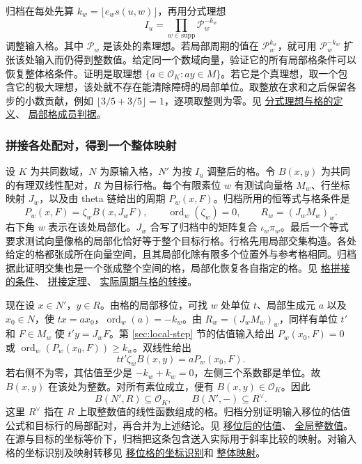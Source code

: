 \documentclass[UTF8,fontset=none,a4paper,11pt]{ctexart}
\theoremstyle{definition}
\newcommand{\src}[3]{\href{https://github.com/leanprover-community/riemann-hypothesis/blob/23aebbb302010b292314d406aa97f7901d698634/src/#1.lean\#L#2}{#3}}
\begin{document}
归档在每处先算 $k_w=\lfloor e_ws(u,w)\rfloor$，再用分式理想
\[
 I_u=\prod_{w\in\mathrm{supp}}\mathcal P_w^{-k_w}
\]
调整输入格。其中 $\mathcal P_w$ 是该处的素理想。若局部周期的值在 $\mathcal P_w^{k_w}$，就可用 $\mathcal P_w^{-k_w}$ 扩张该处输入而仍得到整数值。给定同一个数域向量，验证它的所有局部格条件可以恢复整体格条件。证明是取理想 $\{a\in\mathcal O_K:ay\in M\}$。若它是个真理想，取一个包含它的极大理想，该处就不存在能清除障碍的局部单位。取整放在求和之后保留各步的小数贡献，例如 $\lfloor 3/5+3/5\rfloor=1$，逐项取整则为零。见
\src{Formalism/LocalRingCardinality/DataDIVDefs}{13}{分式理想与格的定义}、
\src{Formalism/SharpRestriction/GlobalSchurBounds/FiniteModelOfAdmissibleTransports}{2217}{局部格成员判据}。

\subsubsection{拼接各处配对，得到一个整体映射}\label{sec:glue}
设 $K$ 为共同数域，$N$ 为原输入格，$N'$ 为按 $I_u$ 调整后的格。令 $B(x,y)$ 为共同的有理双线性配对，$R$ 为目标行格。每个有限素位 $w$ 有测试向量格 $M_w$、行坐标映射 $J_w$，以及由 theta 链给出的周期 $P_w(x,F)$。归档所用的恒等式与格条件是
\[
 P_w(x,F)=\zeta_w B(x,J_wF),\qquad
 \operatorname{ord}_w(\zeta_w)=0,\qquad
 R_w=(J_wM_w)_w .
\]
右下角 $w$ 表示在该处局部化。$J_w$ 合写了归档中的矩阵复合 $\iota_w\pi_w$。最后一个等式要求测试向量像格的局部化恰好等于整个目标行格。行格先用局部交集构造。各处给定的格都张成所在向量空间，且其局部化除有限多个位置外与参考格相同。归档据此证明交集也是一个张成整个空间的格，局部化恢复各自指定的格。见
\src{Formalism/QuotientMetricDivisors/LatticeGlueUnique}{15}{格拼接的条件}、
\src{Formalism/QuotientMetricDivisors/HermitianTwistDivisors/SecondStepGluing}{256}{拼接定理}、
\src{Formalism/LocalToGlobal/IndefiniteForms/PairingConditionOfInverseMatrixIdentity}{393}{实际周期与格的转接}。

现在设 $x\in N'$，$y\in R$。由格的局部移位，可找 $w$ 处单位 $t$、局部生成元 $a$ 以及 $x_0\in N$，使 $tx=ax_0$，$\operatorname{ord}_w(a)=-k_w$。由 $R_w=(J_wM_w)_w$，同样有单位 $t'$ 和 $F\in M_w$ 使 $t'y=J_wF$。第 \ref{sec:local-step} 节的估值输入给出 $P_w(x_0,F)=0$ 或 $\operatorname{ord}_w(P_w(x_0,F))\ge k_w$。双线性给出
\[
             tt'\zeta_w B(x,y)=aP_w(x_0,F).
\]
若右侧不为零，其估值至少是 $-k_w+k_w=0$，左侧三个系数都是单位。故 $B(x,y)$ 在该处为整数。对所有素位成立，便有 $B(x,y)\in\mathcal O_K$。因此
\[
                 B(N',R)\subseteq\mathcal O_K,
       \qquad B(N',-)\subseteq R^\vee .
\]
这里 $R^\vee$ 指在 $R$ 上取整数值的线性函数组成的格。归档分别证明输入移位的估值公式和目标行的局部配对，再合并为上述结论。见
\src{Formalism/QuotientMetricDivisors/HermitianTwistDivisors/TwistedLatticeNaturality}{684}{移位后的估值}、
\src{Formalism/QuotientMetricDivisors/HermitianTwistDivisors/DivIntoDual}{49}{全局整数值}。
在源与目标的坐标等价下，归档把这条包含送入实际用于斜率比较的映射。对输入格的坐标识别及映射转移见
\src{Formalism/LocalToGlobal/Divisibility/DivisibilityConstruction/ShiftOfColTie}{53}{移位格的坐标识别}和
\src{Formalism/LocalToGlobal/Divisibility/RecBridge}{33}{整体映射}。
\end{document}

